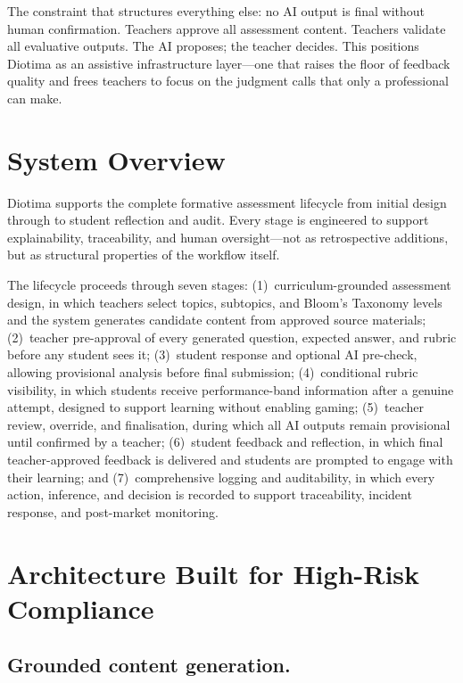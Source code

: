 \documentclass[10pt, a4paper, twocolumn]{article}
\begin{document}
The constraint that structures everything else: no AI output is final without human
confirmation. Teachers approve all assessment content. Teachers validate all evaluative
outputs. The AI proposes; the teacher decides. This positions Diotima as an assistive
infrastructure layer---one that raises the floor of feedback quality and frees teachers
to focus on the judgment calls that only a professional can make.

\section{System Overview}

Diotima supports the complete formative assessment lifecycle from initial design through
to student reflection and audit. Every stage is engineered to support explainability,
traceability, and human oversight---not as retrospective additions, but as structural
properties of the workflow itself.

The lifecycle proceeds through seven stages: (1)~curriculum-grounded assessment design,
in which teachers select topics, subtopics, and Bloom's Taxonomy levels and the system
generates candidate content from approved source materials; (2)~teacher pre-approval of
every generated question, expected answer, and rubric before any student sees it;
(3)~student response and optional AI pre-check, allowing provisional analysis before
final submission; (4)~conditional rubric visibility, in which students receive
performance-band information after a genuine attempt, designed to support learning
without enabling gaming; (5)~teacher review, override, and finalisation, during which
all AI outputs remain provisional until confirmed by a teacher; (6)~student feedback
and reflection, in which final teacher-approved feedback is delivered and students are
prompted to engage with their learning; and (7)~comprehensive logging and auditability,
in which every action, inference, and decision is recorded to support traceability,
incident response, and post-market monitoring.

\section{Architecture Built for High-Risk Compliance}

\subsection{Grounded content generation.}
\end{document}
